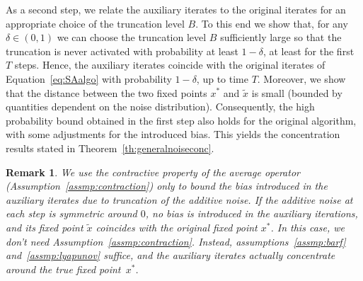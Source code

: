 \documentclass{article}
\newtheorem{remark}{Remark}
\begin{document}
As a second step, we relate the auxiliary iterates to the original iterates for an appropriate choice of the truncation level $B$. To this end we show that, for any $\delta\in(0,1)$ we can choose the truncation level $B$ sufficiently large so that the truncation is never activated with probability at least $1-\delta$, at least for the first $T$ steps.  Hence, the auxiliary iterates coincide with the original iterates of Equation~\eqref{eq:SAalgo} with probability $1-\delta$, up to time $T$. Moreover, we show that the distance between the two fixed points $x^*$ and $\tilde{x}$ is small (bounded by quantities dependent on the noise distribution). Consequently, the high probability bound obtained in the first step also holds for the original algorithm, with some adjustments for the introduced bias. This yields the concentration results stated in Theorem~\ref{th:generalnoiseconc}.






\begin{remark}
    We use the contractive property of the average operator (Assumption~\ref{assmp:contraction}) only to bound the bias introduced in the auxiliary iterates due to truncation of the additive noise. If the additive noise at each step is symmetric around $0$, no bias is introduced in the auxiliary iterations, and its fixed point $\tilde{x}$ coincides with the original fixed point $x^*$. In this case, we don't need Assumption~\ref{assmp:contraction}. Instead, assumptions~\ref{assmp:barf} and~\ref{assmp:lyapunov} suffice, and the auxiliary iterates actually concentrate around the true fixed point~$x^*$.
\end{remark}
\end{document}
